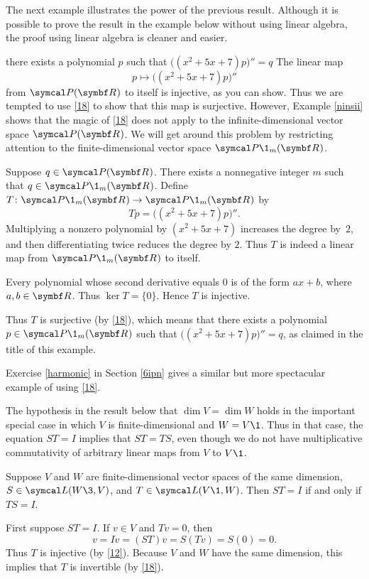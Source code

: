 The next example illustrates the power of the previous result. Although it is possible to prove the result in the example below without using linear algebra, the proof using linear algebra is cleaner and easier.

\begin{example}{\!there exists a polynomial\/ $p$ such that\/ $\bigl((x^2 + 5x + 7)p\bigr)'' = q$}
The linear map
\[
p \mapsto \bigl((x^2 + 5x + 7)p\bigr)''
\]
from $\P(\R{})$ to itself is injective, as you can show. Thus we are tempted to use \ref{18} to show that this map is surjective. However, Example \ref{ninsii} shows that the magic of \ref{18} does not apply to the infinite-dimensional vector space $\P(\R{})$. We will get around this problem by restricting attention to the finite-dimensional vector space $\P\1_m(\R{})$.

Suppose $q \in \P(\R{})$. There exists a nonnegative integer $m$ such that $q \in \P\1_m(\R{})$. Define $T \colon \P\1_m(\R{}) \to \P\1_m(\R{})$ by
\[
Tp = \bigl((x^2 + 5x + 7)p\bigr)''\!.
\]
Multiplying a nonzero polynomial by $(x^2 + 5x + 7)$ increases the degree by~$2$, and then differentiating twice reduces the degree by $2$. Thus $T$ is indeed a linear map from $\P\1_m(\R{})$ to itself.

Every polynomial whose second derivative equals $0$ is of the form $ax + b$, where $a, b \in \R{}$. Thus $\ker T = \{0\}$. Hence $T$ is injective.

Thus $T$ is surjective (by \ref{18}), which means that there exists a polynomial $p \in \P\1_m(\R{})$ such that
$\bigl((x^2 + 5x + 7)p\bigr)'' = q$, as claimed in the title of this example.
\end{example}

Exercise \ref{harmonic} in Section \ref{6ipn} gives a similar but more spectacular example of using \ref{18}.

The hypothesis in the result below that $\dim V = \dim W$ holds in the important special case in which $V$ is finite-dimensional and
$W = V\1$. Thus in that case, the equation $ST = I$ implies that $ST = TS$, even though we do not have multiplicative commutativity of arbitrary linear maps from $V$ to $V\1$.

{Suppose $V$ and $W$ are finite-dimensional vector spaces of the same dimension, $S \in \L(W\3,V)$, and $T \in \L(V\1, W)$.  Then $ST = I$ if and only if $TS = I$.}

\proof
First suppose
$
ST = I$.
If $v \in V$ and $Tv = 0$, then
\[
v = Iv= (ST)v = S(Tv) = S(0) = 0.
\]
Thus $T$ is injective (by \ref{12}). Because $V$ and $W$ have the same dimension, this implies that $T$ is invertible (by \ref{18}).

